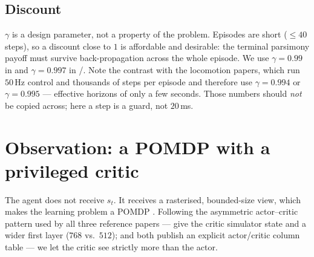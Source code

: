\documentclass[11pt,a4paper]{article}
\begin{document}
\subsection{Discount}

$\gamma$ is a design parameter, not a property of the problem. Episodes are short
($\le 40$ steps), so a discount close to $1$ is affordable and desirable: the terminal
parsimony payoff must survive back-propagation across the whole episode. We use
$\gamma = 0.99$ in \stageI{} and $\gamma = 0.997$ in \stageII{}/\stageIII{}. Note the
contrast with the locomotion papers, which run $50$\,Hz control and thousands of steps per
episode and therefore use $\gamma = 0.994$ \cite{wang2025dribble} or $\gamma = 0.995$
\cite{wang2025vision} --- effective horizons of only a few seconds. Those numbers should
\emph{not} be copied across; here a step is a guard, not $20$\,ms.

\section{Observation: a POMDP with a privileged critic}\label{sec:obs}

The agent does not receive $s_t$. It receives a rasterised, bounded-size view, which makes
the learning problem a POMDP \cite{kaelbling1998pomdp}. Following the asymmetric
actor--critic pattern \cite{pinto2018asymmetric} used by all three reference papers ---
\citet{wang2025dribble} give the critic simulator state and a wider first layer
($768$ vs.\ $512$); \citet{wang2025vision} and \citet{xu2025striker} both publish an explicit
actor/critic column table --- we let the critic see strictly more than the actor.
\end{document}
